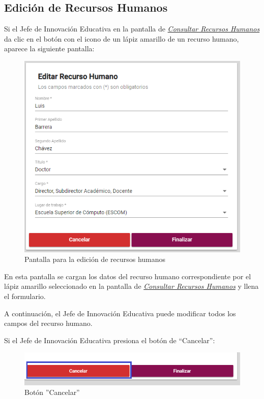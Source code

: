             \subsection{Edición de Recursos Humanos}
                Si el Jefe de Innovación Educativa en la pantalla de \hyperlink{consultarRH}{\textit{Consultar Recursos Humanos}} da clic en el botón con el icono de un lápiz amarillo de un recurso humano, aparece la siguiente pantalla:

                \begin{figure}[H]
                    \centering
                    \hypertarget{editarRH}{\includegraphics[width=0.6\linewidth]{images/SP1/EditarRH}}
                    \caption{Pantalla para la edición de recursos humanos}
                    \label{editarrh}
                \end{figure}

                En esta pantalla se cargan los datos del recurso humano correspondiente por el lápiz amarillo seleccionado en la pantalla de \hyperlink{consultarRH}{\textit{Consultar Recursos Humanos}} y llena el formulario.

                A continuación, el Jefe de Innovación Educativa puede modificar todos los campos del recurso humano.

                Si el Jefe de Innovación Educativa presiona el botón de “Cancelar”:

                \begin{figure}[H]
                    \centering
                    \hypertarget{cancel2}{\includegraphics[width=0.7\linewidth]{images/SP1/BtnCancelar2}}
                    \caption{Botón ''Cancelar''}
                    \label{cancel2}
                \end{figure}

